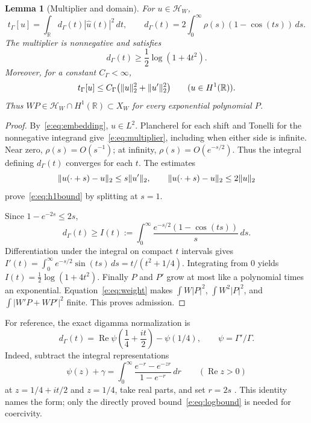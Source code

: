 \documentclass[11pt,a4paper]{article}
\numberwithin{equation}{section}
\newtheorem{lemma}[theorem]{Lemma}
\theoremstyle{definition}\newtheorem{definition}[theorem]{Definition}
\theoremstyle{remark}\newtheorem{remark}[theorem]{Remark}
\newcommand{\R}{\mathbb R}\newcommand{\C}{\mathbb C}\newcommand{\N}{\mathbb N}
\newcommand{\HH}{\mathcal H_W}\newcommand{\XX}{X_W}\newcommand{\EE}{\mathcal E_{N,\beta}}
\newcommand{\tg}{t_\Gamma}\newcommand{\cg}{c_\Gamma}
\DeclareMathOperator{\Rea}{Re}\DeclareMathOperator{\Ima}{Im}
\begin{document}
\begin{lemma}[Multiplier and domain]\label{e:lem:gamma}
For $u\in\HH$,
\begin{equation}\label{e:eq:multiplier}
 \tg[u]=\int_\R d_\Gamma(t)|\widehat u(t)|^2\,dt,
 \qquad
 d_\Gamma(t)=2\int_0^\infty\rho(s)(1-\cos(ts))\,ds.
\end{equation}
The multiplier is nonnegative and satisfies
\begin{equation}\label{e:eq:logbound}
 d_\Gamma(t)\ge\frac12\log(1+4t^2).
\end{equation}
Moreover, for a constant $C_\Gamma<\infty$,
\begin{equation}\label{e:eq:h1bound}
 \tg[u]\le C_\Gamma\bigl(\norm u_2^2+\norm{u'}_2^2\bigr)
 \qquad(u\in H^1(\R)).
\end{equation}
Thus $WP\in\HH\cap H^1(\R)\subset\XX$ for every exponential polynomial
$P$.
\end{lemma}
\begin{proof}
By~\eqref{e:eq:embedding}, $u\in L^2$. Plancherel for each shift and Tonelli
for the nonnegative integrand give~\eqref{e:eq:multiplier}, including when
either side is infinite. Near zero, $\rho(s)=O(s^{-1})$; at infinity,
$\rho(s)=O(e^{-s/2})$. Thus the integral defining $d_\Gamma(t)$ converges
for each $t$. The estimates
\[
 \lVert u(\cdot+s)-u\rVert_2\le s\lVert u'\rVert_2,
 \qquad \lVert u(\cdot+s)-u\rVert_2\le2\lVert u\rVert_2
\]
prove~\eqref{e:eq:h1bound} by splitting at $s=1$.

Since $1-e^{-2s}\le2s$,
\[
 d_\Gamma(t)\ge I(t):=\int_0^\infty
 \frac{e^{-s/2}(1-\cos(ts))}{s}\,ds.
\]
Differentiation under the integral on compact $t$ intervals gives
$I'(t)=\int_0^\infty e^{-s/2}\sin(ts)\,ds=t/(t^2+1/4)$.
Integrating from $0$ yields $I(t)=\tfrac12\log(1+4t^2)$.
Finally $P$ and $P'$ grow at most like a polynomial times an exponential.
Equation~\eqref{e:eq:weight} makes
$\int W|P|^2$, $\int W^2|P|^2$, and
$\int |W'P+WP'|^2$ finite. This proves admission.
\end{proof}

For reference, the exact digamma normalization is
\begin{equation}\label{e:eq:digamma}
 d_\Gamma(t)=\Rea\psi\left(\frac14+\frac{it}{2}\right)-\psi(1/4),
 \qquad \psi=\Gamma'/\Gamma.
\end{equation}
Indeed, subtract the integral representations
\[
 \psi(z)+\gamma=\int_0^\infty
 \frac{e^{-r}-e^{-zr}}{1-e^{-r}}\,dr\qquad(\Rea z>0)
\]
at $z=1/4+it/2$ and $z=1/4$, take real parts, and set $r=2s$
\cite[Eq.~5.9.16]{DLMF}. This identity names the form; only the directly
proved bound~\eqref{e:eq:logbound} is needed for coercivity.
\end{document}
